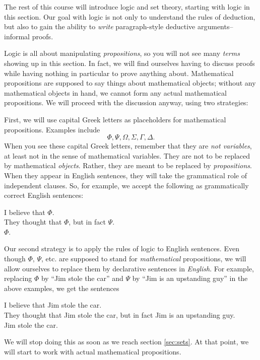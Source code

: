 \documentclass[12pt]{article}
\def\pA{\Phi}
\def\pB{\Psi}
\def\pC{\Omega}
\def\pD{\Sigma}
\def\pE{\Gamma}
\def\pF{\Delta}
\begin{document}
The rest of this course will introduce logic and set theory, starting with logic in this section.
Our goal with logic is not only to understand the rules of deduction,
but also to gain the ability to \emph{write} paragraph-style deductive arguments-- informal proofs.

Logic is all about manipulating \emph{propositions}, so you will not see many \emph{terms} showing up in this section.
In fact, we will find ourselves having to discuss proofs while having nothing in particular to prove anything about.
Mathematical propositions are supposed to say things about mathematical objects;
without any mathematical objects in hand, we cannot form any actual mathematical propositions.
We will proceed with the discussion anyway, using two strategies:

First, we will use capital Greek letters as placeholders for mathematical propositions. Examples include
$$
\pA,
\pB,
\pC,
\pD,
\pE,
\pF.
$$
When you see these capital Greek letters, remember that they are \emph{not variables},
at least not in the sense of mathematical variables. They are not to be replaced by mathematical \emph{objects}.
Rather, they are meant to be replaced by \emph{propositions}.
When they appear in English sentences, they will take the grammatical role of independent clauses.
So, for example, we accept the following as grammatically correct English sentences:
\begin{adjustwidth}{2em}{}
I believe that $\pA$.\\
They thought that $\pA$, but in fact $\pB$.\\
$\pA$.
\end{adjustwidth}

Our second strategy
is to apply the rules of logic to English sentences.
Even though $\pA$, $\pB$, etc. are supposed to stand for \emph{mathematical} propositions,
we will allow ourselves to replace them by declarative sentences in \emph{English}.
For example, replacing $\pA$ by ``Jim stole the car'' and $\pB$ by ``Jim is an upstanding guy'' in the above examples, we get the sentences
\begin{adjustwidth}{2em}{}
I believe that Jim stole the car.\\
They thought that Jim stole the car, but in fact Jim is an upstanding guy.\\
Jim stole the car.
\end{adjustwidth}
We will stop doing this as soon as we reach section \ref{sec:sets}. At that point, we will start to work with actual mathematical propositions.
\end{document}
